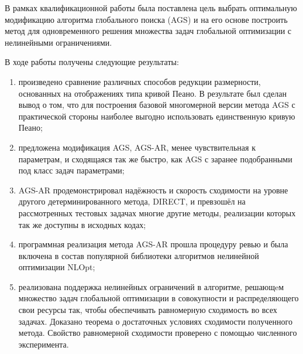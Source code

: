 
В рамках квалификационной работы была поставлена цель выбрать оптимальную модификацию алгоритма глобального поиска (AGS)
и на его основе построить метод для одновременного решения множества задач глобальной оптимизации с нелинейными ограничениями.

В ходе работы получены следующие результаты:
\begin{enumerate}
    \item произведено сравнение различных способов редукции размерности, основанных на отображениях типа кривой Пеано.
    В результате был сделан вывод о том, что для построения базовой многомерной версии метода AGS 
    с практической стороны наиболее выгодно использовать единственную кривую Пеано;
    \item предложена модификация AGS, AGS-AR, менее чувствительная к параметрам, и сходящаяся так же быстро, как AGS
    с заранее подобранными под класс задач параметрами;
    \item AGS-AR продемонстрировал надёжность и скорость сходимости на уровне другого детерминированного метода, DIRECT,
    и превзошёл на рассмотренных тестовых задачах многие другие методы, реализации которых так же доступны в исходных кодах;
    \item программная реализация метода AGS-AR прошла процедуру ревью и была включена в состав популярной библиотеки
    алгоритмов нелинейной оптимизации NLOpt;
    \item реализована поддержка нелинейных ограничений в алгоритме, решающeм
    множество задач глобальной оптимизации в совокупности и распределяющего свои ресурсы так, чтобы
    обеспечивать равномерную сходимость во всех задачах. Доказано теорема о достаточных условиях сходимости
    полученного метода. Свойство равномерной сходимости проверено с помощью численного эксперимента.
\end{enumerate}
